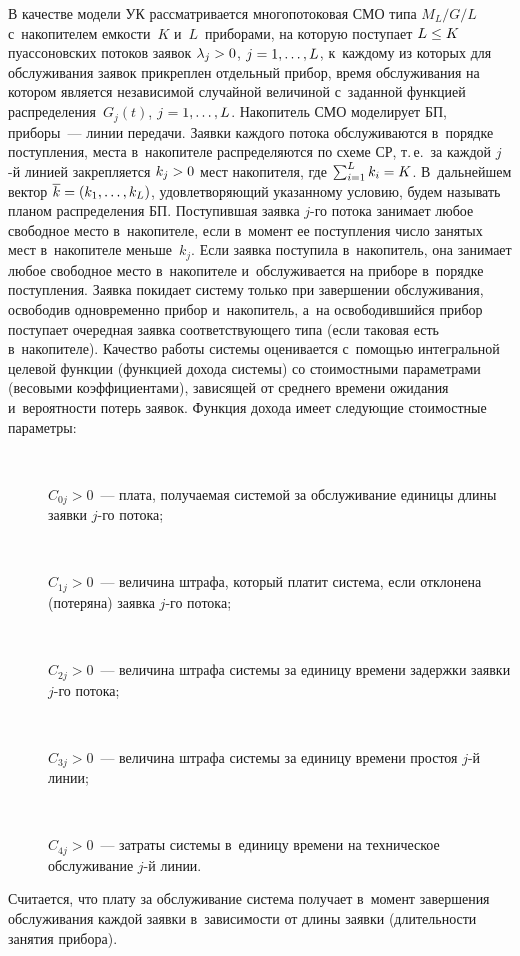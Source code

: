 \begin{multicols}{2}
  В качестве модели УК рассматривается многопотоковая СМО типа 
$M_L/G/L$ с~накопителем емкости~$K$ и~$L$~приборами, на которую 
поступает $L\hm\leq K$ пуассоновских потоков заявок $\lambda_j\hm> 0$, 
$j\hm=1,\ldots, L$, к~каждому из которых для обслуживания заявок прикреплен 
отдельный прибор, время обслуживания на котором является независимой 
случайной величиной с~заданной функцией распределения~$G_j(t)$, 
$j\hm=1,\ldots, L$. Накопитель СМО моделирует БП, приборы~--- линии 
передачи. Заявки каждого потока обслуживаются в~порядке поступления, места 
в~накопителе распределяются по схеме СР, т.\,е.\ за каждой $j$-й линией 
закрепляется $k_j\hm>0$ мест накопителя, где $\sum\nolimits_{i=1}^L k_i\hm=K$. 
В~дальнейшем вектор $\overline{k}\hm= (k_1,\ldots , k_L)$, удовлетворяющий 
указанному условию, будем называть планом распределения БП. Поступившая 
заявка $j$-го потока занимает любое свободное место в~накопителе, если 
в~момент ее поступления число занятых мест в~накопителе меньше~$k_j$. Если 
заявка поступила в~накопитель, она занимает любое свободное место 
в~накопителе и~обслуживается на приборе в~порядке поступления. Заявка 
покидает систему только при завершении обслуживания, освободив 
одновременно прибор и~накопитель, а~на освободившийся прибор поступает 
очередная заявка соответствующего типа (если таковая есть в~накопителе). 
Качество работы системы оценивается с~помощью интегральной целевой 
функции (функцией дохода системы) со стоимостными па\-ра\-мет\-ра\-ми (весовыми 
коэффициентами), зависящей от среднего времени ожидания и~вероятности 
потерь заявок. Функция дохода имеет следующие стоимостные параметры:
  \begin{description}
  \item[\,]
  $C_{0j}>0$~--- плата, получаемая системой за обслуживание единицы длины 
заявки $j$-го потока; 
  \item[\,]
  $C_{1j}>0$~--- величина штрафа, который платит сис\-те\-ма, если отклонена 
(потеряна) заявка $j$-го потока;
  \item[\,]
  $C_{2j}>0$~--- величина штрафа системы за единицу времени задержки 
заявки $j$-го потока;
  \item[\,]
  $C_{3j}>0$~--- величина штрафа системы за единицу времени простоя $j$-й 
линии; 
  \item[\,]
  $C_{4j}>0$~--- затраты системы в~единицу времени на техническое 
обслуживание $j$-й линии.
  \end{description}
  
  Считается, что плату за обслуживание система получает в~момент 
завершения обслуживания каж\-дой заявки в~зависимости от длины заявки 
(длительности занятия прибора).
  

\end{multicols}
